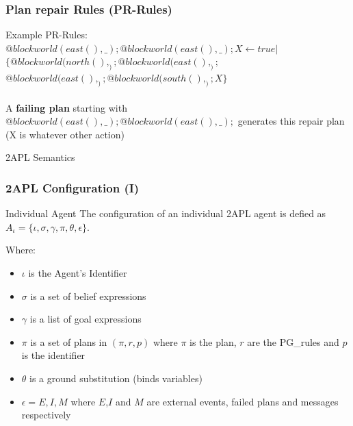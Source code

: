 \documentclass{beamer}
\newcommand\tab[1][1cm]{\hspace*{#1}}
\begin{document}
\begin{frame}
\frametitle{Plan repair Rules (PR-Rules)}
	\begin{block}{Example}
		PR-Rules:\\
        \tab $@blockworld(east(),\_);@blockworld(east(),\_);X \leftarrow true | $\\
	    \tab \tab $\{ @blockworld(north(),_);@blockworld(east(),_);$ \\
         \tab \tab $@blockworld(east(),_);@blockworld(south(),_);X \}$ \\~\\
         
	A \textbf{failing plan} starting with $@blockworld(east(),\_);@blockworld(east(),\_);$ generates this repair plan (X is whatever other action)
    \end{block}
\end{frame}


%


\begin{frame}
\Huge{\centerline{2APL Semantics}}
\end{frame}


\begin{frame}
\frametitle{2APL Configuration (I)}

\begin{block}{ Individual Agent}
The configuration of an individual 2APL agent is defied as $ A_\iota = \{\iota, \sigma, \gamma , \pi, \theta, \epsilon \} $.
\end{block}
Where:
\begin{itemize}
\item $\iota$ is the Agent's Identifier
\item $\sigma$ is a set of belief expressions
\item $\gamma$ is a list of goal expressions
\item $\pi$ is a set of plans in $(\pi, r, p)$ where $\pi$ is the plan, $r$ are the PG\_rules and $p$ is the identifier
\item $\theta$ is a ground substitution (binds variables)
\item $\epsilon = E,I,M$ where $E$,$I$ and $M$ are external events, failed plans and messages respectively
\end{itemize}

\end{frame}
\end{document}
